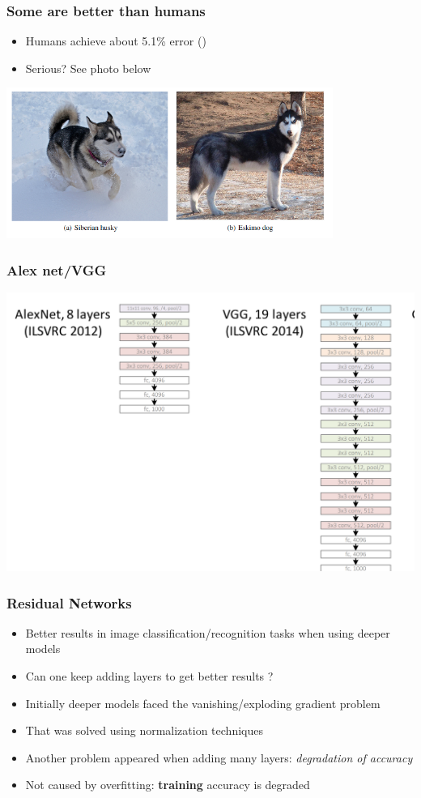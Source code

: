 \documentclass{beamer}
\begin{document}
\begin{frame}
	\frametitle{Some are better than humans}

	\begin{itemize}
		\item Humans achieve about 5.1\% error (\cite{human})
		\item Serious? See photo below
	\end{itemize}
\begin{center}
	\includegraphics[width=0.8\textwidth]{figs/dogs.png}
\end{center}
\end{frame}

\begin{frame}
    \frametitle{Alex net/VGG}
    \includegraphics[width=\textwidth]{figs/alex-vgg.png}
   \href{https://icml.cc/2016/tutorials/icml2016_tutorial_deep_residual_networks_kaiminghe.pdf}{}
\end{frame}

\begin{frame}
	\frametitle{Residual Networks}
\begin{itemize}
	\item Better results in image classification/recognition tasks when using deeper models 
	\item Can one keep adding layers  to get better results ?
	\item Initially deeper models faced the vanishing/exploding gradient problem
	\item That was solved using normalization techniques
	\item Another problem appeared when adding many layers: \textit{degradation of accuracy}
	\item Not caused by overfitting: \textbf{training} accuracy is degraded 
\end{itemize}
\end{frame}
\end{document}
